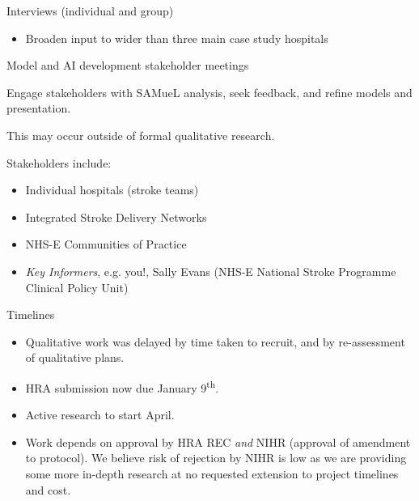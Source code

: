 \documentclass[xcolor={usenames,dvipsnames}]{beamer}
\begin{document}

\begin{frame}{Interviews (individual and group)}

\begin{itemize}
    \setlength\itemsep{3mm}
    \item Broaden input to wider than three main case study hospitals
\end{itemize}
\end{frame}


\begin{frame}{Model and AI development stakeholder meetings}

Engage stakeholders with SAMueL analysis, seek feedback, and refine models and presentation.

\vspace{3mm}

This may occur outside of formal qualitative research.

\vspace{3mm}
Stakeholders include:

\begin{itemize}
    \item Individual hospitals (stroke teams)
    \item Integrated Stroke Delivery Networks
    \item NHS-E Communities of Practice
    \item \emph{Key Informers}, e.g. you!, Sally Evans (NHS-E National Stroke Programme Clinical Policy Unit)
\end{itemize}

\end{frame}

\begin{frame}{Timelines}

\begin{itemize}
    \setlength\itemsep{4mm}
    \item Qualitative work was delayed by time taken to recruit, and by re-assessment of qualitative plans.
    \item HRA submission now due January 9\textsuperscript{th}. 
    \item Active research to start April.
    \item Work depends on approval by HRA REC \emph{and} NIHR (approval of amendment to protocol). We believe risk of rejection by NIHR is low as we are providing some more in-depth research at no requested extension to project timelines and cost.

\end{itemize}
    
\end{frame}
\end{document}
